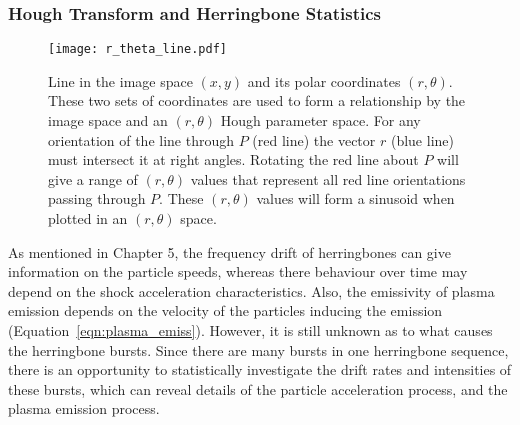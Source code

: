 \subsubsection{Hough Transform and Herringbone Statistics}
\begin{figure}[t!]
\begin{center}
\texttt{[image: r\_theta\_line.pdf]}
\caption[Line in polar coordinates]{Line in the image space $(x,y)$ and its polar coordinates $(r, \theta)$. These two sets of coordinates are used to form a relationship by the image space and an $(r, \theta)$ Hough parameter space. For any orientation of the line through $P$ (red line) the vector $r$ (blue line) must intersect it at right angles. Rotating the red line about $P$ will give a range of $(r, \theta)$ values that represent all red line orientations passing through $P$. These $(r, \theta)$ values will form a sinusoid when plotted in an $(r, \theta)$ space.}
\label{fig:r_theta_line}
\end{center}
\end{figure}
As mentioned in Chapter 5, the frequency drift of herringbones can give information on the particle speeds, whereas there behaviour over time may depend on the shock acceleration characteristics. Also, the emissivity of plasma emission depends on the velocity of the particles inducing the emission (Equation~\ref{eqn:plasma_emiss}). However, it is still unknown as to what causes the herringbone bursts. Since there are many bursts in one herringbone sequence, there is an opportunity to statistically investigate the drift rates and intensities of these bursts, which can reveal details of the particle acceleration process, and the plasma emission process.

